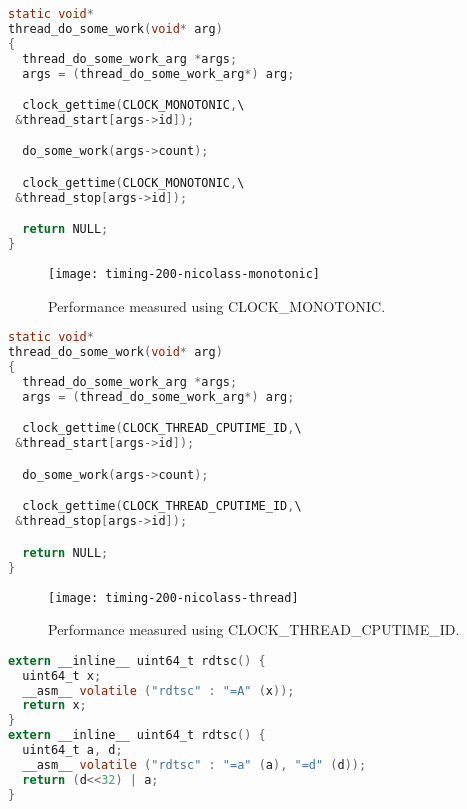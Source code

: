 \begin{lstlisting}[caption={Code using CLOCK\_MONOTONIC to monitor time.},label={lst:monotonic},language=C]
static void*
thread_do_some_work(void* arg)
{
  thread_do_some_work_arg *args;
  args = (thread_do_some_work_arg*) arg;

  clock_gettime(CLOCK_MONOTONIC,\
 &thread_start[args->id]);

  do_some_work(args->count);

  clock_gettime(CLOCK_MONOTONIC,\
 &thread_stop[args->id]);

  return NULL;
}
\end{lstlisting}

\begin{figure}
\centering
\texttt{[image: timing-200-nicolass-monotonic]}
\caption{Performance measured using CLOCK\_MONOTONIC.}
\label{fig:monotonic}
\end{figure}

\begin{lstlisting}[caption={Code using CLOCK\_THREAD\_CPUTIME\_ID to monitor time.},label={lst:thread},language=C]
static void*
thread_do_some_work(void* arg)
{
  thread_do_some_work_arg *args;
  args = (thread_do_some_work_arg*) arg;

  clock_gettime(CLOCK_THREAD_CPUTIME_ID,\
 &thread_start[args->id]);

  do_some_work(args->count);

  clock_gettime(CLOCK_THREAD_CPUTIME_ID,\
 &thread_stop[args->id]);

  return NULL;
}
\end{lstlisting}

\begin{figure}
\centering
\texttt{[image: timing-200-nicolass-thread]}
\caption{Performance measured using CLOCK\_THREAD\_CPUTIME\_ID.}
\label{fig:thread}
\end{figure}

\begin{lstlisting}[caption={C inline assembly implementation of rdtsc using hardware registers.},label={lst:rdtsc},language=C]
extern __inline__ uint64_t rdtsc() {
  uint64_t x;
  __asm__ volatile ("rdtsc" : "=A" (x));
  return x;
}
extern __inline__ uint64_t rdtsc() {
  uint64_t a, d;
  __asm__ volatile ("rdtsc" : "=a" (a), "=d" (d));
  return (d<<32) | a;
}
\end{lstlisting}

